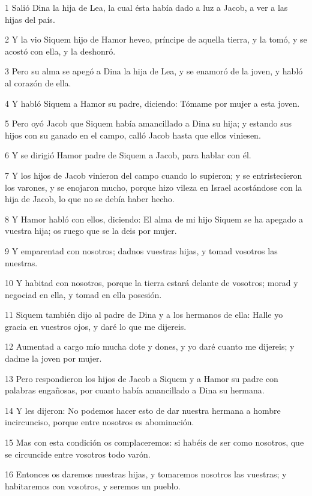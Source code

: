 \par 1 Salió Dina la hija de Lea, la cual ésta había dado a luz a Jacob, a ver a las hijas del país.
\par 2 Y la vio Siquem hijo de Hamor heveo, príncipe de aquella tierra, y la tomó, y se acostó con ella, y la deshonró.
\par 3 Pero su alma se apegó a Dina la hija de Lea, y se enamoró de la joven, y habló al corazón de ella.
\par 4 Y habló Siquem a Hamor su padre, diciendo: Tómame por mujer a esta joven.
\par 5 Pero oyó Jacob que Siquem había amancillado a Dina su hija; y estando sus hijos con su ganado en el campo, calló Jacob hasta que ellos viniesen.
\par 6 Y se dirigió Hamor padre de Siquem a Jacob, para hablar con él.
\par 7 Y los hijos de Jacob vinieron del campo cuando lo supieron; y se entristecieron los varones, y se enojaron mucho, porque hizo vileza en Israel acostándose con la hija de Jacob, lo que no se debía haber hecho.
\par 8 Y Hamor habló con ellos, diciendo: El alma de mi hijo Siquem se ha apegado a vuestra hija; os ruego que se la deis por mujer.
\par 9 Y emparentad con nosotros; dadnos vuestras hijas, y tomad vosotros las nuestras.
\par 10 Y habitad con nosotros, porque la tierra estará delante de vosotros; morad y negociad en ella, y tomad en ella posesión.
\par 11 Siquem también dijo al padre de Dina y a los hermanos de ella: Halle yo gracia en vuestros ojos, y daré lo que me dijereis.
\par 12 Aumentad a cargo mío mucha dote y dones, y yo daré cuanto me dijereis; y dadme la joven por mujer.
\par 13 Pero respondieron los hijos de Jacob a Siquem y a Hamor su padre con palabras engañosas, por cuanto había amancillado a Dina su hermana.
\par 14 Y les dijeron: No podemos hacer esto de dar nuestra hermana a hombre incircunciso, porque entre nosotros es abominación.
\par 15 Mas con esta condición os complaceremos: si habéis de ser como nosotros, que se circuncide entre vosotros todo varón.
\par 16 Entonces os daremos nuestras hijas, y tomaremos nosotros las vuestras; y habitaremos con vosotros, y seremos un pueblo.
